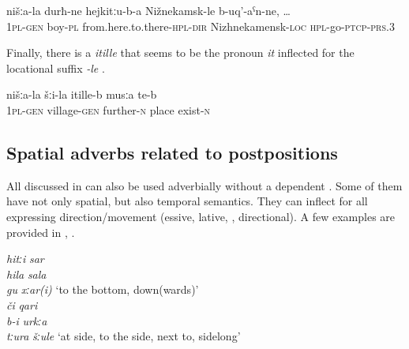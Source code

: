%
\begin{exe}
	\ex	\label{ex:if our sons go from here to there to Nizhnekamensk}
	\gll	nišːa-la	durħ-ne	hejkitːu-b-a	Nižnekamsk-le	b-uq'-aˁn-ne, \ldots\\
		1\textsc{pl}-\textsc{gen}	boy-\textsc{pl}	from.here.to.there-\textsc{hpl}-\textsc{dir}	Nizhnekamensk-\textsc{loc}	\textsc{hpl}-go-\textsc{ptcp}-\textsc{prs}.3\\
	\glt	{}
\end{exe}

Finally, there is a  \textit{itille}  that seems to be the pronoun \textit{it} inflected for the locational suffix \textit{-le} .
%
\begin{exe}
	\ex	\label{ex:At that side of the village there is a place}
	\gll	nišːa-la	šːi-la	itille-b	musːa	te-b \\
		1\textsc{pl}-\textsc{gen}	village-\textsc{gen}	further-\textsc{n}	place	exist-\textsc{n}\\
	\glt	{}
\end{exe}



\subsection{Spatial adverbs related to postpositions}
\label{ssec:SpatialAdverbsDerivedFromPostpositions}

All  discussed in  can also be used adverbially without a dependent  . Some of them have not only spatial, but also temporal semantics. They can inflect for all  expressing direction\slash movement (essive, lative, , directional). A few examples are provided in , .
%
\begin{exe}
	\ex	\label{ex:adjectivesWithCHIB}
		\TabPositions{12em}
		\textit{hitːi} 			\tab	\textit{sar}  \\
		\textit{hila }	\tab	\textit{sala}  \\
		\textit{gu} 		\tab	\textit{xːar(i)} `to the bottom, down(wards)'\\
		\textit{či} 		\tab		\textit{qari}  \\
		\textit{b-i} 			\tab		\textit{urkːa}  \\
		\textit{tːura} 		\tab		\textit{šːule} `at side, to the side, next to, sidelong'
\end{exe}

